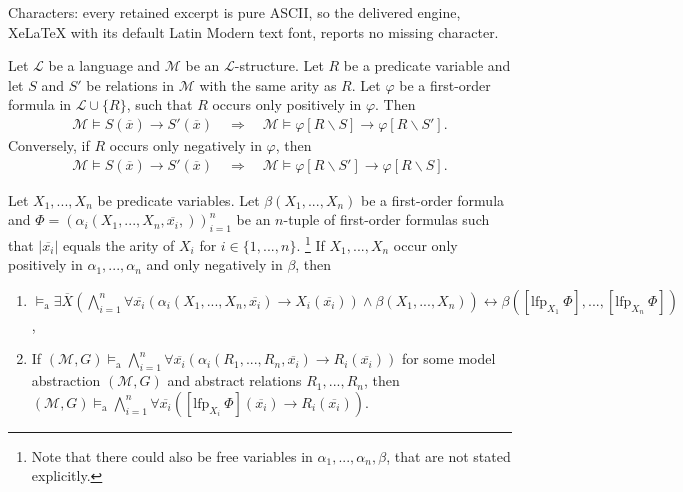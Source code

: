\documentclass[10pt,a4paper]{amsart}
\newcommand{\calL}{\mathcal{L}}
\newcommand{\calM}{\mathcal{M}}
\newcommand{\impl}{\rightarrow} %
\newcommand{\lfp}{\mathrm{lfp}} %
\newcommand{\modelsa}{\models_\mathrm{a}} %
\newcommand{\mybar}[1]{\overline{#1}}
\begin{document}
Characters: every retained excerpt is pure ASCII, so the delivered engine, XeLaTeX with its default Latin Modern text font, reports no missing character.
\begin{lemma}\label{lem.ImplPositiv}
	Let $\calL$ be a language and $\calM$ be an $\calL$-structure. Let $R$ be a predicate variable and let $S$ and $S'$ be relations in $\calM$ with the same arity as $R$. Let $\varphi$ be a first-order formula in $\calL \cup \{R\}$, such that $R$ occurs only positively in $\varphi$. Then
	\begin{align*}
		\calM \models S(\mybar{x}) \rightarrow S'(\mybar{x}) \quad \Rightarrow \quad \calM \models \varphi[R \backslash S] \rightarrow \varphi[R \backslash S'].
	\end{align*}
	Conversely, if $R$ occurs only negatively in $\varphi$, then
	\begin{align*}
		\calM \models S(\mybar{x}) \rightarrow S'(\mybar{x}) \quad \Rightarrow \quad \calM \models \varphi[R \backslash S'] \rightarrow \varphi[R \backslash S].
	\end{align*}
\end{lemma}

\begin{lemma}\label{lem.abstractNonnengart}
	Let $X_1,...,X_n$ be predicate variables. Let $\beta(X_1,...,X_n)$ be a first-order formula and $\Phi = (\alpha_i(X_1,...,X_n,\mybar{x_i},))_{i=1}^n$ be an $n$-tuple of first-order formulas such that $|\mybar{x_i}|$ equals the arity of $X_i$ for $i \in \{1,...,n\}$. \footnote{Note that there could also be free variables in $\alpha_1,...,\alpha_n,\beta$, that are not stated explicitly.} If $X_1,...,X_n$ occur only positively in $\alpha_1,...,\alpha_n$ and only negatively in $\beta$, then 
	\begin{enumerate}
		\item $\modelsa \exists \mybar{X} \left(\bigwedge_{i=1}^n \forall \mybar{x_i} \left(\alpha_i(X_1,...,X_n,\mybar{x_i}) \impl X_i(\mybar{x_i})\right) \wedge \beta(X_1,...,X_n) \right) \leftrightarrow \beta([\lfp_{X_1} ~\Phi],...,[\lfp_{X_n} ~\Phi])$,
		\item If  $(\calM,G) \modelsa \bigwedge_{i=1}^n \forall \mybar{x_i} \left(\alpha_i( R_1,...,R_n,\mybar{x_i}) \impl R_i(\mybar{x_i})\right)$ for some model abstraction $(\calM,G)$ and abstract relations $R_1,...,R_n$, then $(\calM,G) \modelsa \bigwedge_{i=1}^n \forall \mybar{x_i} ([\lfp_{X_i} ~\Phi](\mybar{x_i}) \impl R_i(\mybar{x_i}))$.
	\end{enumerate}
\end{lemma}
\end{document}
